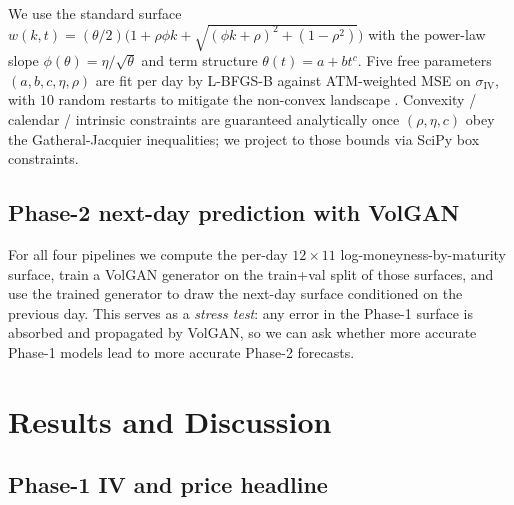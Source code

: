 \documentclass[11pt,a4paper]{article}
\newcommand{\iv}{\sigma_{\mathrm{IV}}}
\begin{document}
We use the standard \citet{gatheral2014ssvi} surface
$w(k, t) = (\theta/2)\bigl(1 + \rho \phi k + \sqrt{(\phi k + \rho)^2 +
(1 - \rho^2)}\bigr)$ with the power-law slope $\phi(\theta) = \eta /
\sqrt{\theta}$ and term structure $\theta(t) = a + b t^{c}$. Five free
parameters $(a, b, c, \eta, \rho)$ are fit per day by L-BFGS-B against
ATM-weighted MSE on $\iv$, with $10$ random restarts to mitigate the
non-convex landscape \citep{corbetta2018ssvi}. Convexity / calendar /
intrinsic constraints are guaranteed analytically once
$(\rho, \eta, c)$ obey the Gatheral-Jacquier inequalities; we project to
those bounds via SciPy box constraints.

\subsection{Phase-2 next-day prediction with VolGAN}

For all four pipelines we compute the per-day $12 \times 11$
log-moneyness-by-maturity surface, train a VolGAN \citep{cont2025volgan}
generator on the train+val split of those surfaces, and use the trained
generator to draw the next-day surface conditioned on the previous day.
This serves as a \emph{stress test}: any error in the Phase-1 surface is
absorbed and propagated by VolGAN, so we can ask whether more accurate
Phase-1 models lead to more accurate Phase-2 forecasts.

\section{Results and Discussion}
\label{sec:results}

\subsection{Phase-1 IV and price headline}
\end{document}

